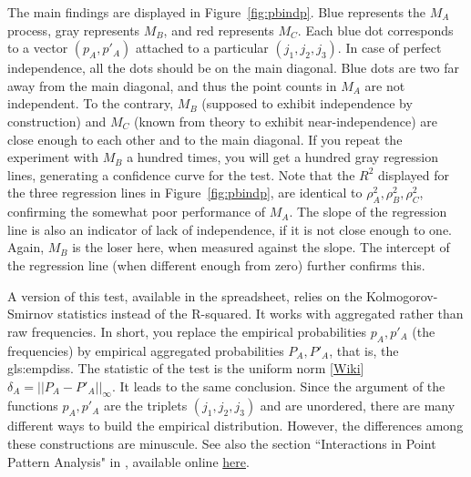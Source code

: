\documentclass[10pt]{article}
\begin{document}
The main findings are displayed in Figure~\ref{fig:pbindp}.  Blue represents the $M_A$ process, gray represents $M_B$, and red represents $M_C$. Each blue dot
corresponds to a vector $(p_A, p'_A)$ attached to a particular $(j_1,j_2,j_3)$. In case of perfect independence, all the dots should be on the main diagonal. Blue dots
are two far away from the main diagonal, and thus the point counts in $M_A$ are not independent. To the contrary, $M_B$ (supposed to exhibit independence by construction) and $M_C$
(known from theory to exhibit near-independence) are close enough to each other and to the main diagonal. If you repeat the experiment with $M_B$ a hundred times, you will get a hundred
gray regression lines, generating a confidence curve for the test. Note that the $R^2$ displayed for the three regression lines in Figure~\ref{fig:pbindp}, are identical to
$\rho_A^2, \rho_B^2,\rho_C^2$, confirming the somewhat poor performance of $M_A$. The slope of the regression line is also an indicator of lack of independence, if it is not close
enough to one. Again, $M_B$ is the loser here, when measured against the slope. The intercept of the regression line (when different enough from zero) further confirms this.

A version of this test, available in the spreadsheet, relies on the Kolmogorov-Smirnov statistics instead of the R-squared. It works with aggregated rather than raw frequencies. In short,
you replace the empirical probabilities $p_A,p'_A$ (the frequencies) by empirical aggregated probabilities $P_A,P'_A$, that is,
 the  \glspl{gls:empdis}. The statistic of the test is the uniform norm
[\href{https://en.wikipedia.org/wiki/Uniform_norm}{Wiki}] $\delta_A=||P_A-P'_A||_\infty$. It leads to the same conclusion. Since the argument of the functions $p_A,p'_A$ are the triplets $(j_1,j_2,j_3)$
and are unordered, there are many different ways to build the empirical distribution. However, the differences among these constructions are minuscule. See also the section
``Interactions in Point Pattern Analysis" in \cite{ppindep}, available online \href{https://www.geo.fu-berlin.de/en/v/soga/Geodata-analysis/Spatial-Point-patterns/Analysis-of-spatial-point-patterns/Interactions/index.html}{here}.\\

\end{document}
